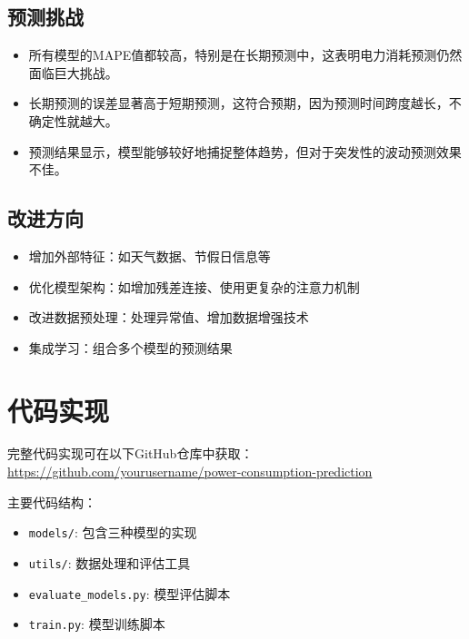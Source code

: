 \documentclass[a4paper,11pt]{article}
\begin{document}
\subsection{预测挑战}
\begin{itemize}
    \item 所有模型的MAPE值都较高，特别是在长期预测中，这表明电力消耗预测仍然面临巨大挑战。
    \item 长期预测的误差显著高于短期预测，这符合预期，因为预测时间跨度越长，不确定性就越大。
    \item 预测结果显示，模型能够较好地捕捉整体趋势，但对于突发性的波动预测效果不佳。
\end{itemize}

\subsection{改进方向}
\begin{itemize}
    \item 增加外部特征：如天气数据、节假日信息等
    \item 优化模型架构：如增加残差连接、使用更复杂的注意力机制
    \item 改进数据预处理：处理异常值、增加数据增强技术
    \item 集成学习：组合多个模型的预测结果
\end{itemize}

\section{代码实现}
完整代码实现可在以下GitHub仓库中获取：\\
\url{https://github.com/yourusername/power-consumption-prediction}

主要代码结构：
\begin{itemize}
    \item \texttt{models/}: 包含三种模型的实现
    \item \texttt{utils/}: 数据处理和评估工具
    \item \texttt{evaluate\_models.py}: 模型评估脚本
    \item \texttt{train.py}: 模型训练脚本
\end{itemize}
\end{document}
